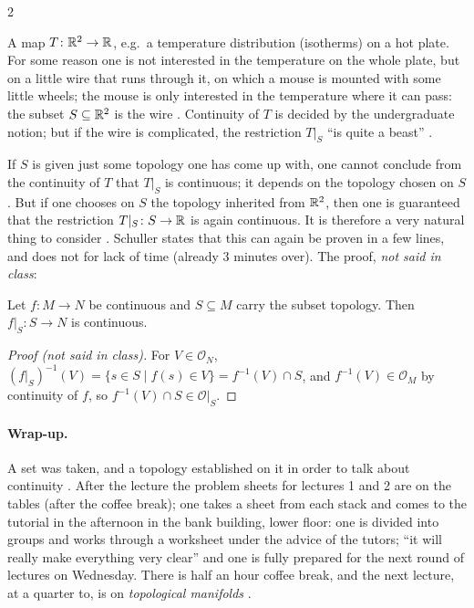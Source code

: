 \begin{paracol}{2}
\begin{example}\label{ex:c01-mouse}
A map $T\colon\mathbb{R}^2\to\mathbb{R}$, e.g.\ a temperature distribution (isotherms) on a hot plate. For some reason one is not interested in the temperature on the whole plate, but on a little wire that
runs through it, on which a mouse is mounted with some little wheels; the mouse is only interested in the temperature where it can pass: the subset
$S\subseteq\mathbb{R}^2$ is the wire . Continuity of $T$ is decided by the undergraduate notion; but if the wire is
complicated, the restriction $T|_S$ ``is quite a beast'' .
\end{example}
If $S$ is given just some topology one has come up with, one cannot conclude from the continuity of $T$ that $T|_S$ is continuous; it depends on the topology chosen on $S$. But if one chooses
on $S$ the topology inherited from $\mathbb{R}^2$, then one is guaranteed that the restriction $T|_S\colon S\to\mathbb{R}$ is again continuous. It is therefore a very natural thing to consider
. Schuller states that this can again be proven in a few lines, and does not for lack of time (already 3 minutes
over). The proof, \emph{not said in class}:
\begin{proposition}\label{prop:c01-restriction}
Let $f\colon M\to N$ be continuous and $S\subseteq M$ carry the subset topology. Then $f|_S\colon S\to N$ is continuous.
\end{proposition}
\begin{proof}[Proof (not said in class)]
For $V\in\mathcal O_N$, $(f|_S)^{-1}(V)=\{s\in S\mid f(s)\in V\}=f^{-1}(V)\cap S$, and $f^{-1}(V)\in\mathcal O_M$ by continuity of $f$, so $f^{-1}(V)\cap S\in\mathcal O|_S$.
\end{proof}

\paragraph{Wrap-up.} A set was taken, and a topology established on it in order to talk about continuity . After the lecture the problem sheets for lectures 1 and
2 are on the tables (after the coffee break); one takes a sheet from each stack and comes to the tutorial in the afternoon in the bank building, lower floor: one is divided into groups
and works through a worksheet under the advice of the tutors; ``it will really make everything very clear'' and one is fully prepared for the next round of lectures on Wednesday.
There is half an hour coffee break, and the next lecture, at a quarter to, is on \emph{topological manifolds} .


\end{paracol}
